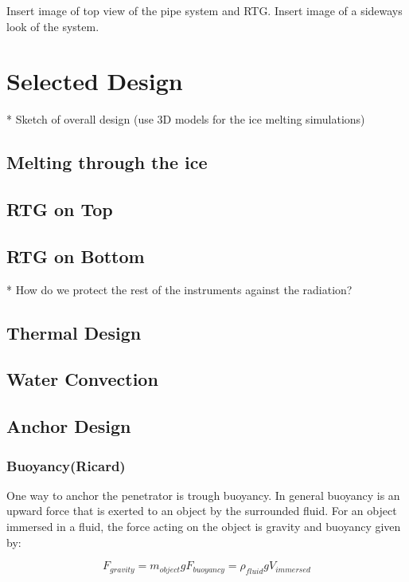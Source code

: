 Insert image of top view of the pipe system and RTG. 
Insert image of a sideways look of the system.


\section{Selected Design}

* Sketch of overall design (use 3D models for the ice melting simulations)

\subsection{Melting through the ice} %

\subsection{RTG on Top}

\subsection{RTG on Bottom}

* How do we protect the rest of the instruments against the radiation?





\subsection{Thermal Design}

\subsection{Water Convection}

\subsection{Anchor Design}
\subsubsection{Buoyancy(Ricard)}

One way to anchor the penetrator is trough buoyancy. In general buoyancy is an upward force that is exerted to an object by the surrounded fluid. For an object immersed in a fluid, the force acting on the object is gravity and buoyancy given by:

\begin{subequations}\label{eq:bouyancy1}
\begin{equation}\label{eq:bouyancy1}
F_{gravity} = m_{object}g
\end{equation}
\begin{equation} \label{eq:bouyancy2}
F_{buoyancy} = \rho_{fluid}g V_{immersed} 
\end{equation}
\end{subequations}

